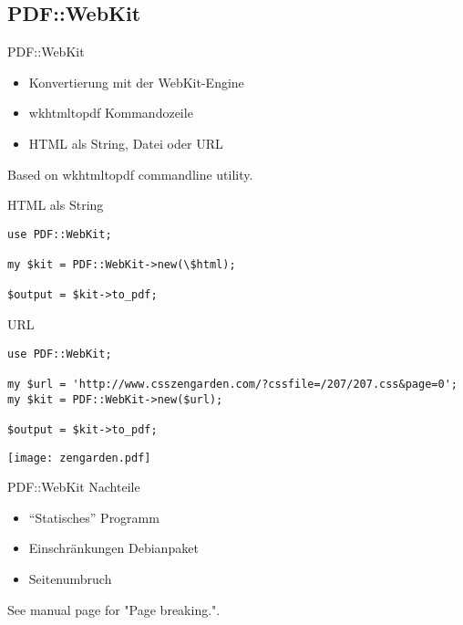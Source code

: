 \subsection{PDF::WebKit}
\begin{frame}{PDF::WebKit}
  \begin{itemize}
  \item Konvertierung mit der WebKit-Engine
  \item wkhtmltopdf Kommandozeile
  \item HTML als String, Datei oder URL
  \end{itemize}
\end{frame}

Based on wkhtmltopdf commandline utility.

\begin{frame}[fragile]{HTML als String}
\begin{lstlisting}
use PDF::WebKit;

my $kit = PDF::WebKit->new(\$html);

$output = $kit->to_pdf;
\end{lstlisting}
\end{frame}

\begin{frame}[fragile]{URL}
\begin{lstlisting}
use PDF::WebKit;

my $url = 'http://www.csszengarden.com/?cssfile=/207/207.css&page=0';
my $kit = PDF::WebKit->new($url);

$output = $kit->to_pdf;
\end{lstlisting}
\end{frame}

\begin{frame}
\texttt{[image: zengarden.pdf]}
\end{frame}

\begin{frame}{PDF::WebKit Nachteile}
  \begin{itemize}
  \item ``Statisches'' Programm
  \item Einschränkungen Debianpaket
  \item Seitenumbruch
  \end{itemize}
\end{frame}

See manual page for "Page breaking.".


